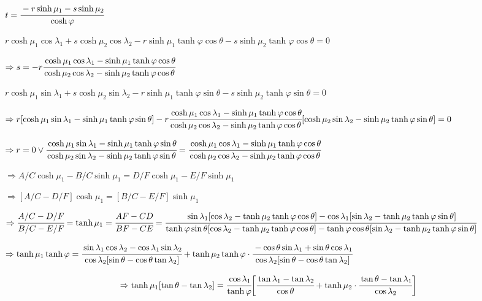 \documentclass[10pt,a4paper]{article}
\begin{document}
		 $t = \cfrac{- r \sinh \mu_1 - s \sinh \mu_2}{\cosh \varphi} $

		 $r \cosh \mu_1 \cos \lambda_1 + s \cosh \mu_2 \cos \lambda_2 - r \sinh \mu_1 \tanh \varphi \cos \theta  - s \sinh \mu_2 \tanh \varphi \cos \theta = 0$

		 $\Rightarrow s = - r \cfrac{\cosh \mu_1 \cos \lambda_1 - \sinh \mu_1 \tanh \varphi \cos \theta}{\cosh \mu_2 \cos \lambda_2 - \sinh \mu_2 \tanh \varphi \cos \theta}$

		 $r \cosh \mu_1 \sin \lambda_1 + s \cosh \mu_2 \sin \lambda_2  - r \sinh \mu_1 \tanh \varphi \sin \theta  - s \sinh \mu_2 \tanh \varphi \sin \theta = 0$

		 $\Rightarrow r [\cosh \mu_1 \sin \lambda_1 - \sinh \mu_1 \tanh \varphi \sin \theta] - r \cfrac{\cosh \mu_1 \cos \lambda_1 - \sinh \mu_1 \tanh \varphi \cos \theta}{\cosh \mu_2 \cos \lambda_2 - \sinh \mu_2 \tanh \varphi \cos \theta} [\cosh \mu_2 \sin \lambda_2  - \sinh \mu_2 \tanh \varphi \sin \theta] = 0$

		 $\Rightarrow r = 0 \vee \cfrac{\cosh \mu_1 \sin \lambda_1 - \sinh \mu_1 \tanh \varphi \sin \theta}{\cosh \mu_2 \sin \lambda_2  - \sinh \mu_2 \tanh \varphi \sin \theta} = \cfrac{\cosh \mu_1 \cos \lambda_1 - \sinh \mu_1 \tanh \varphi \cos \theta}{\cosh \mu_2 \cos \lambda_2 - \sinh \mu_2 \tanh \varphi \cos \theta}$

		 $\Rightarrow A/C \cosh \mu_1 - B/C \sinh \mu_1 = D/F \cosh \mu_1 - E/F \sinh \mu_1$

		 $\Rightarrow [A/C - D/F] \cosh \mu_1 = [B/C - E/F] \sinh \mu_1$

		 $\Rightarrow \cfrac{A/C - D/F}{B/C - E/F} = \tanh \mu_1 = \cfrac{AF - CD}{BF - CE} = \cfrac{\sin \lambda_1 [\cos \lambda_2 - \tanh \mu_2 \tanh \varphi \cos \theta] - \cos \lambda_1 [\sin \lambda_2  - \tanh \mu_2 \tanh \varphi \sin \theta]}{\tanh \varphi \sin \theta [\cos \lambda_2 - \tanh \mu_2 \tanh \varphi \cos \theta] - \tanh \varphi \cos \theta [\sin \lambda_2  - \tanh \mu_2 \tanh \varphi \sin \theta]}$

		 $\Rightarrow \tanh \mu_1 \tanh \varphi = \cfrac{\sin \lambda_1 \cos \lambda_2 - \cos \lambda_1 \sin \lambda_2}{ \cos \lambda_2 [ \sin \theta - \cos \theta \tan \lambda_2] } +  \tanh \mu_2 \tanh \varphi \cdot \cfrac{ - \cos \theta \sin \lambda_1  + \sin \theta \cos \lambda_1}{ \cos \lambda_2 [ \sin \theta - \cos \theta \tan \lambda_2] }$

		 \begin{align}
		 \Rightarrow \tanh \mu_1 [ \tan \theta - \tan \lambda_2] = \cfrac{\cos \lambda_1}{\tanh \varphi} \bigg[ \cfrac{\tan \lambda_1 - \tan \lambda_2}{ \cos \theta } +  \tanh \mu_2 \cdot \cfrac{\tan \theta - \tan \lambda_1}{ \cos \lambda_2 } \bigg] \label{igualdade_louca}
		 \end{align}
\end{document}
